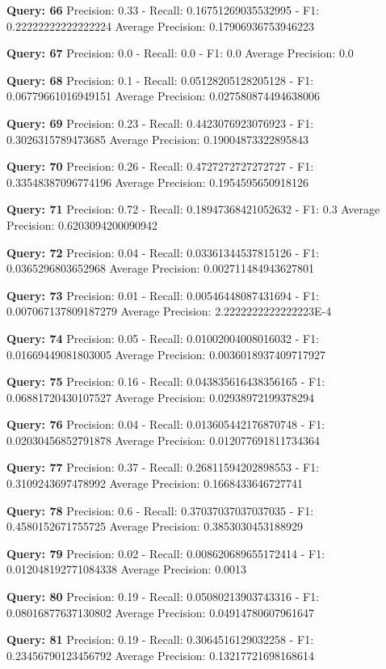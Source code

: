 \documentclass[a4paper, 11pt]{article}
\begin{document}
\textbf{Query: 66}
Precision: 0.33 - Recall: 0.16751269035532995 - F1: 0.22222222222222224 Average Precision: 0.17906936753946223

\textbf{Query: 67}
Precision: 0.0 - Recall: 0.0 - F1: 0.0 Average Precision: 0.0

\textbf{Query: 68}
Precision: 0.1 - Recall: 0.05128205128205128 - F1: 0.06779661016949151 Average Precision: 0.027580874494638006

\textbf{Query: 69}
Precision: 0.23 - Recall: 0.4423076923076923 - F1: 0.3026315789473685 Average Precision: 0.19004873322895843

\textbf{Query: 70}
Precision: 0.26 - Recall: 0.4727272727272727 - F1: 0.33548387096774196 Average Precision: 0.1954595650918126

\textbf{Query: 71}
Precision: 0.72 - Recall: 0.18947368421052632 - F1: 0.3 Average Precision: 0.6203094200090942

\textbf{Query: 72}
Precision: 0.04 - Recall: 0.03361344537815126 - F1: 0.0365296803652968 Average Precision: 0.002711484943627801

\textbf{Query: 73}
Precision: 0.01 - Recall: 0.00546448087431694 - F1: 0.007067137809187279 Average Precision: 2.2222222222222223E-4

\textbf{Query: 74}
Precision: 0.05 - Recall: 0.01002004008016032 - F1: 0.01669449081803005 Average Precision: 0.0036018937409717927

\textbf{Query: 75}
Precision: 0.16 - Recall: 0.043835616438356165 - F1: 0.06881720430107527 Average Precision: 0.02938972199378294

\textbf{Query: 76}
Precision: 0.04 - Recall: 0.013605442176870748 - F1: 0.02030456852791878 Average Precision: 0.012077691811734364

\textbf{Query: 77}
Precision: 0.37 - Recall: 0.26811594202898553 - F1: 0.3109243697478992 Average Precision: 0.1668433646727741

\textbf{Query: 78}
Precision: 0.6 - Recall: 0.37037037037037035 - F1: 0.4580152671755725 Average Precision: 0.3853030453188929

\textbf{Query: 79}
Precision: 0.02 - Recall: 0.008620689655172414 - F1: 0.012048192771084338 Average Precision: 0.0013

\textbf{Query: 80}
Precision: 0.19 - Recall: 0.05080213903743316 - F1: 0.08016877637130802 Average Precision: 0.04914780607961647

\textbf{Query: 81}
Precision: 0.19 - Recall: 0.3064516129032258 - F1: 0.23456790123456792 Average Precision: 0.13217721698168614
\end{document}
